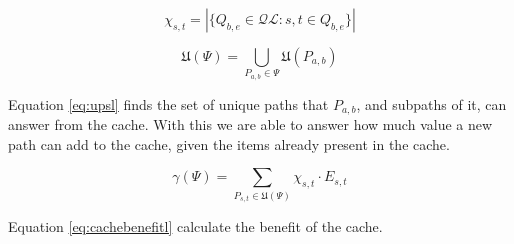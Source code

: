 \begin{equation} \label{eq:chil}
\chi_{s,t} =  |\{ Q_{b,e} \in \mathcal{QL}: s, t \in Q_{b,e} \}|
\end{equation}


\begin{equation} \label{eq:upsl}
 \mathfrak{U}(\Psi) = \bigcup\limits_{P_{a,b} \in \Psi} \mathfrak{U}(P_{a,b})
\end{equation}

Equation \ref{eq:upsl} finds the set of unique paths that $P_{a,b}$, and subpaths of it, can answer from the cache. With this we are able to answer how much value a new path can add to the cache, given the items already present in the cache.

\begin{equation} \label{eq:cachebenefitl}
\gamma(\Psi) = \sum\limits_{P_{s,t} \in \mathfrak{U}(\Psi)} \chi_{s,t} \cdot E_{s,t}
\end{equation}

Equation \ref{eq:cachebenefitl} calculate the benefit of the cache.







% 
% 
% 
% 
% 
% 
